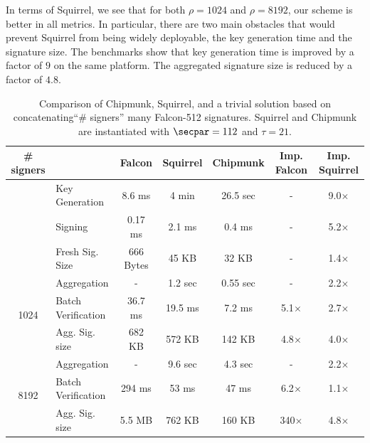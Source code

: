 In terms of Squirrel, we see that for both $\rho = 1024$ and $\rho = 8192$, our scheme is better in all metrics.
In particular, there are two main obstacles that would prevent Squirrel from being widely deployable, the key generation time and the signature size.
The benchmarks show that key generation time is improved by a factor of $9$ on the same platform.
The aggregated signature size is reduced by a factor of $4.8$.
\bgroup
\setlength{\tabcolsep}{0.5em}
\renewcommand{\arraystretch}{1.1}
\begin{table}\centering
  \begin{tabular}{clccccc}
    \# signers      &                 & Falcon      & Squirrel  & Chipmunk  & Imp. Falcon & Imp. Squirrel \\\toprule
    \multirow{2}{*}{} 
                    & Key Generation  & 8.6 ms      & 4 min     & 26.5 sec  &     -       & 9.0$\times$ \\%
                    & Signing         & 0.17 ms     & 2.1 ms    & 0.4 ms    &     -       & 5.2$\times$ \\%
                    &Fresh Sig. Size  & 666 Bytes   & 45 KB     & 32 KB     &     -       & 1.4$\times$ \\\midrule
    \multirow{3}{*}{1024}                
                    &Aggregation      & -           & 1.2 sec   & 0.55 sec  &     -       & 2.2$\times$ \\%
                    &Batch Verification    
                                      & 36.7 ms     & 19.5 ms   & 7.2 ms    & 5.1$\times$ & 2.7$\times$ \\%
                    
                    &Agg. Sig. size   & 682 KB      & 572 KB    & 142 KB    & 4.8$\times$ & 4.0$\times$ \\\midrule
    \multirow{3}{*}{8192}                
                    &Aggregation      & -           & 9.6 sec   & 4.3 sec   &     -       & 2.2$\times$ \\%
                    &Batch Verification    
                                      & 294 ms      & 53  ms    &  47 ms    & 6.2$\times$ & 1.1$\times$ \\%
                    &Agg. Sig. size   & 5.5 MB      & 762 KB    & 160 KB    & 340$\times$ & 4.8$\times$\\ \bottomrule
  \end{tabular}
  \caption{Comparison of Chipmunk, Squirrel, and a trivial solution based on concatenating``\# signers'' many Falcon-512 signatures. Squirrel and Chipmunk are instantiated with $\secpar = 112$ and $\tau=21$.}

\end{table}

